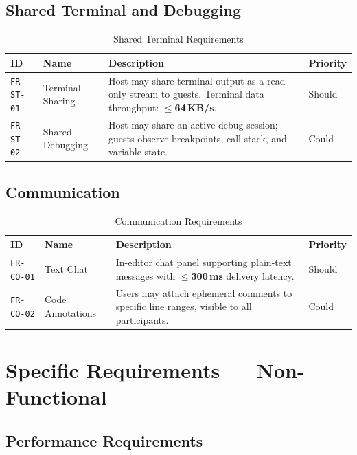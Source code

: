 \documentclass[12pt, a4paper, oneside]{article}
\newcommand{\reqid}[1]{\texttt{\textcolor{primaryblue}{#1}}}
\newcommand{\metric}[1]{\textbf{\textcolor{accentgreen}{#1}}}
\begin{document}
\subsection{Shared Terminal and Debugging}

\begin{table}[H]
\centering
\caption{Shared Terminal Requirements}
\begin{tabularx}{\textwidth}{l l X l}
\toprule
\textbf{ID} & \textbf{Name} & \textbf{Description} & \textbf{Priority} \\
\midrule
\reqid{FR-ST-01} & Terminal Sharing & Host may share terminal output as a read-only stream to guests. Terminal data throughput: \metric{$\leq$64\,KB/s}. & Should \\
\reqid{FR-ST-02} & Shared Debugging & Host may share an active debug session; guests observe breakpoints, call stack, and variable state. & Could \\
\bottomrule
\end{tabularx}
\end{table}

\subsection{Communication}

\begin{table}[H]
\centering
\caption{Communication Requirements}
\begin{tabularx}{\textwidth}{l l X l}
\toprule
\textbf{ID} & \textbf{Name} & \textbf{Description} & \textbf{Priority} \\
\midrule
\reqid{FR-CO-01} & Text Chat & In-editor chat panel supporting plain-text messages with \metric{$\leq$300\,ms} delivery latency. & Should \\
\reqid{FR-CO-02} & Code Annotations & Users may attach ephemeral comments to specific line ranges, visible to all participants. & Could \\
\bottomrule
\end{tabularx}
\end{table}

\section{Specific Requirements --- Non-Functional}

\subsection{Performance Requirements}
\end{document}
